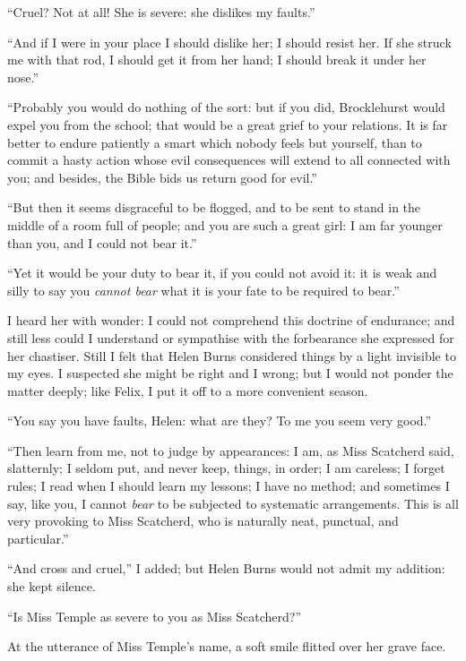 \enquote{Cruel?  Not at all!  She is severe: she dislikes my faults.}

\enquote{And if I were in your place I should dislike her; I should
	resist her.  If she struck me with that rod, I should get it from her
	hand; I should break it under her nose.}

\enquote{Probably you would do nothing of the sort: but if you did, \Mr{}
	Brocklehurst would expel you from the school; that would be a great
	grief to your relations.  It is far better to endure patiently a smart
	which nobody feels but yourself, than to commit a hasty action whose
	evil consequences will extend to all connected with you; and besides,
	the Bible bids us return good for evil.}

\enquote{But then it seems disgraceful to be flogged, and to be sent to
	stand in the middle of a room full of people; and you are such a great
	girl: I am far younger than you, and I could not bear it.}

\enquote{Yet it would be your duty to bear it, if you could not avoid it: it is
	weak and silly to say you \emph{cannot bear} what it is your fate to be
	required to bear.}

I heard her with wonder: I could not comprehend this doctrine of
endurance; and still less could I understand or sympathise with the
forbearance she expressed for her chastiser.  Still I felt that Helen
Burns considered things by a light invisible to my eyes.  I suspected
she might be right and I wrong; but I would not ponder the matter
deeply; like Felix, I put it off to a more convenient season.

\enquote{You say you have faults, Helen: what are they?  To me you seem
	very good.}

\enquote{Then learn from me, not to judge by appearances: I am, as Miss
	Scatcherd said, slatternly; I seldom put, and never keep, things, in
	order; I am careless; I forget rules; I read when I should learn my
	lessons; I have no method; and sometimes I say, like you, I cannot
	\emph{bear} to be subjected to systematic arrangements.  This is all
	very provoking to Miss Scatcherd, who is naturally neat, punctual, and
	particular.}

\enquote{And cross and cruel,} I added; but Helen Burns would not admit
my addition: she kept silence.

\enquote{Is Miss Temple as severe to you as Miss Scatcherd?}

At the utterance of Miss Temple's name, a soft smile flitted over her
grave face.

